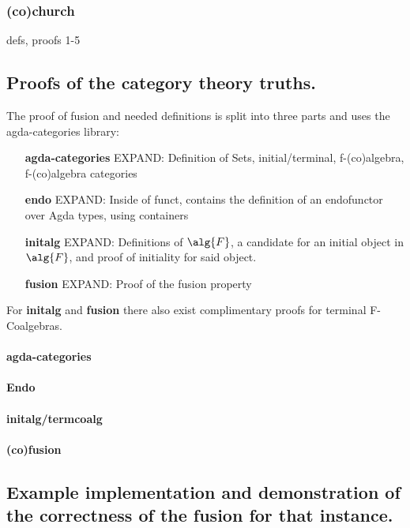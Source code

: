 \subsubsection{(co)church}
defs, proofs 1-5

\subsection{Proofs of the category theory truths.}\label{sec:cat_truths}
The proof of fusion and needed definitions is split into three parts and uses the agda-categories library: %
\begin{itemize}
    \item[\textbf{agda-categories}] EXPAND: Definition of Sets, initial/terminal, f-(co)algebra, f-(co)algebra categories
    \item[\textbf{endo}] EXPAND: Inside of funct, contains the definition of an endofunctor over Agda types, using containers
    \item[\textbf{initalg}] EXPAND: Definitions of $\alg{F}$, a candidate for an initial object in $\alg{F}$, and proof of initiality for said object.
    \item[\textbf{fusion}] EXPAND: Proof of the fusion property
\end{itemize}
For \textbf{initalg} and \textbf{fusion} there also exist complimentary proofs for terminal F-Coalgebras.

\paragraph{agda-categories}
\paragraph{Endo}
\paragraph{initalg/termcoalg}
\paragraph{(co)fusion}


\subsection{Example implementation and demonstration of the correctness of the fusion for that instance.}




